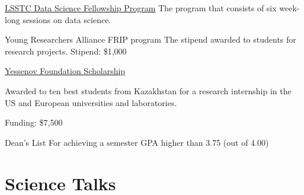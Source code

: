 \documentclass[10pt]{article} %
\begin{document}
\begin{paracol}{1}




	
	{\href{https://www.lsstcorporation.org/fellowship_program}{LSSTC Data Science Fellowship Program}} %
	{The program that consists of six week-long sessions on data science.} %
	
	{Young Researchers Alliance FRIP program}
	{The stipend awarded to students for research projects. Stipend: \$1,000}
	
	
	\nonstopmode
	{\href{http://yessenovfoundation.org/en/}{Yessenov Foundation Scholarship}}
	{Awarded to ten best students from Kazakhstan for a research  internship in the US and European universities and laboratories. 
	
	Funding: \$7,500}

	{Dean’s List}
	{For achieving a semester GPA higher than 3.75 (out of 4.00)}
	
	



\section{Science Talks}



\end{paracol}
\end{document}
